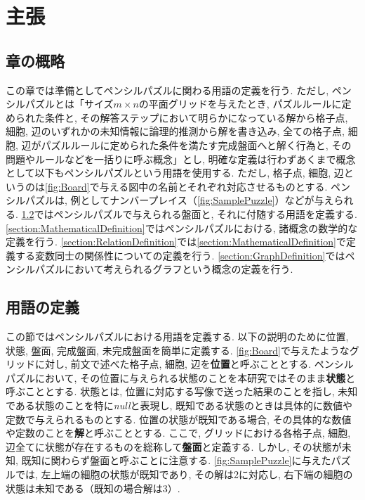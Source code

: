 \chapter{主張}\label{chapter:Prepare}
\section{章の概略}\label{section:Outline}
この章では準備としてペンシルパズルに関わる用語の定義を行う. ただし, ペンシルパズルとは「サイズ$m\times n$の平面グリッドを与えたとき, パズルルールに定められた条件と, その解答ステップにおいて明らかになっている解から格子点, 細胞, 辺のいずれかの未知情報に論理的推測から解を書き込み, 全ての格子点, 細胞, 辺がパズルルールに定められた条件を満たす完成盤面へと解く行為と, その問題やルールなどを一括りに呼ぶ概念」とし, 明確な定義は行わずあくまで概念として以下もペンシルパズルという用語を使用する. ただし, 格子点, 細胞, 辺というのは\cref{fig:Board}で与える図中の名前とそれぞれ対応させるものとする.
ペンシルパズルは, 例としてナンバープレイス（\cref{fig:SamplePuzzle}）などが与えられる.
\cref{section:WordDefinition}ではペンシルパズルで与えられる盤面と, それに付随する用語を定義する.
\cref{section:MathematicalDefinition}ではペンシルパズルにおける, 諸概念の数学的な定義を行う.
\cref{section:RelationDefinition}では\cref{section:MathematicalDefinition}で定義する変数同士の関係性についての定義を行う.
\cref{section:GraphDefinition}ではペンシルパズルにおいて考えられるグラフという概念の定義を行う.

\section{用語の定義}\label{section:WordDefinition}
この節ではペンシルパズルにおける用語を定義する.
以下の説明のために位置, 状態, 盤面, 完成盤面, 未完成盤面を簡単に定義する. \cref{fig:Board}で与えたようなグリッドに対し, 前文で述べた格子点, 細胞, 辺を\textbf{位置}と呼ぶこととする. ペンシルパズルにおいて, その位置に与えられる状態のことを本研究ではそのまま\textbf{状態}と呼ぶこととする. 状態とは, 位置に対応する写像で送った結果のことを指し, 未知である状態のことを特に\textit{null}と表現し, 既知である状態のときは具体的に数値や定数で与えられるものとする. 位置の状態が既知である場合, その具体的な数値や定数のことを\textbf{解}と呼ぶこととする. ここで, グリッドにおける各格子点, 細胞, 辺全てに状態が存在するものを総称して\textbf{盤面}と定義する. しかし, その状態が未知, 既知に関わらず盤面と呼ぶことに注意する. \cref{fig:SamplePuzzle}に与えたパズルでは, 左上端の細胞の状態が既知であり, その解は2に対応し, 右下端の細胞の状態は未知である（既知の場合解は3）.

